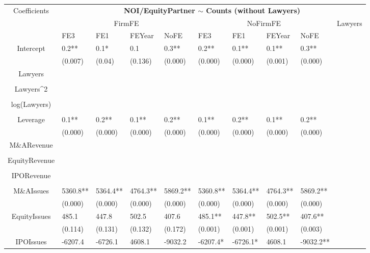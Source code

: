 \documentclass{article}
\begin{document}
\begin{table}[H]
\centering
\begin{tabular}{|clllllllll|}
\hline
\multirow{3}{*}{Coefficients} & \multicolumn{9}{c|}{\textbf{NOI/EquityPartner $\sim$ Counts (without Lawyers)}} \\
\cline{2-10}
& \multicolumn{4}{c}{FirmFE} & \multicolumn{4}{c}{NoFirmFE} & \multirow{2}{*}{Lawyers} \\
\cline{2-9}
& FE3 & FE1 & FEYear & NoFE & FE3 & FE1 & FEYear & NoFE &  \\
\hline
 
Intercept & 0.2** & 0.1* & 0.1 & 0.3** & 0.2** & 0.1** & 0.1** & 0.3** & \\ 
   & (0.007) & (0.04) & (0.136) & (0.000) & (0.000) & (0.000) & (0.001) & (0.000) & \\ 
  Lawyers &  &  &  &  &  &  &  &  & \\ 
   &  &  &  &  &  &  &  &  & \\ 
  Lawyers^2 &  &  &  &  &  &  &  &  & \\ 
   &  &  &  &  &  &  &  &  & \\ 
  log(Lawyers) &  &  &  &  &  &  &  &  & \\ 
   &  &  &  &  &  &  &  &  & \\ 
  Leverage & 0.1** & 0.2** & 0.1** & 0.2** & 0.1** & 0.2** & 0.1** & 0.2** & \\ 
   & (0.000) & (0.000) & (0.000) & (0.000) & (0.000) & (0.000) & (0.000) & (0.000) & \\ 
  M\&ARevenue &  &  &  &  &  &  &  &  & \\ 
   &  &  &  &  &  &  &  &  & \\ 
  EquityRevenue &  &  &  &  &  &  &  &  & \\ 
   &  &  &  &  &  &  &  &  & \\ 
  IPORevenue &  &  &  &  &  &  &  &  & \\ 
   &  &  &  &  &  &  &  &  & \\ 
  M\&AIssues & 5360.8** & 5364.4** & 4764.3** & 5869.2** & 5360.8** & 5364.4** & 4764.3** & 5869.2** & \\ 
   & (0.000) & (0.000) & (0.000) & (0.000) & (0.000) & (0.000) & (0.000) & (0.000) & \\ 
  EquityIssues & 485.1 & 447.8 & 502.5 & 407.6 & 485.1** & 447.8** & 502.5** & 407.6** & \\ 
   & (0.114) & (0.131) & (0.132) & (0.172) & (0.001) & (0.001) & (0.001) & (0.003) & \\ 
  IPOIssues & -6207.4 & -6726.1 & 4608.1 & -9032.2 & -6207.4* & -6726.1* & 4608.1 & -9032.2** & \\ 

\end{tabular}
\end{table}
\end{document}
